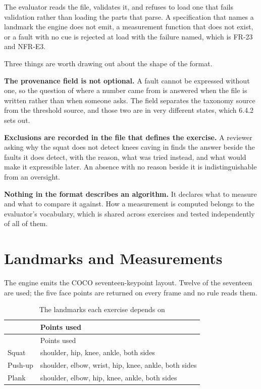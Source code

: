 The evaluator reads the file, validates it, and refuses to load one that fails validation rather than loading the parts that parse. A specification that names a landmark the engine does not emit, a measurement function that does not exist, or a fault with no cue is rejected at load with the failure named, which is FR-23 and NFR-E3.

Three things are worth drawing out about the shape of the format.

\textbf{The provenance field is not optional.} A fault cannot be expressed without one, so the question of where a number came from is answered when the file is written rather than when someone asks. The field separates the taxonomy source from the threshold source, and those two are in very different states, which 6.4.2 sets out.

\textbf{Exclusions are recorded in the file that defines the exercise.} A reviewer asking why the squat does not detect knees caving in finds the answer beside the faults it does detect, with the reason, what was tried instead, and what would make it expressible later. An absence with no reason beside it is indistinguishable from an oversight.

\textbf{Nothing in the format describes an algorithm.} It declares what to measure and what to compare it against. How a measurement is computed belongs to the evaluator's vocabulary, which is shared across exercises and tested independently of all of them.

\section{Landmarks and Measurements}
\label{sec:6.2}

The engine emits the COCO seventeen-keypoint layout. Twelve of the seventeen are used; the five face points are returned on every frame and no rule reads them.

{\small
\setlength{\LTpre}{6pt}\setlength{\LTpost}{8pt}
\begin{longtable}{>{\raggedright\arraybackslash}p{}>{\raggedright\arraybackslash}p{}}
\caption{The landmarks each exercise depends on}\\
\toprule
 & Points used \\
\midrule
\endfirsthead
\toprule
 & Points used \\
\midrule
\endhead
\bottomrule
\endfoot
\bottomrule
\endlastfoot
Squat & shoulder, hip, knee, ankle, both sides \\
Push-up & shoulder, elbow, wrist, hip, knee, ankle, both sides \\
Plank & shoulder, elbow, hip, knee, ankle, both sides \\
\end{longtable}
}

